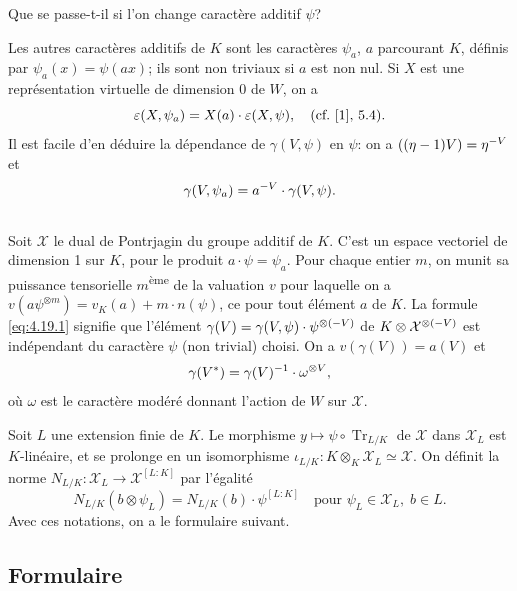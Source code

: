 \documentclass[12pt,a4paper]{article}
\theoremstyle{plain}
\theoremstyle{definition}
\theoremstyle{remark}
\DeclareMathOperator{\Tr}{Tr}
\newcommand{\cX}{\mathcal{X}}
\let\dim\relax\let\det\relax
\providecommand{\cX}{\mathcal{X}}
\providecommand{\Tr}{\operatorname{Tr}}
\begin{document}
Que se passe-t-il si l'on change caract\`ere additif $\psi$?

Les autres caract\`eres additifs de $K$ sont les caract\`eres $\psi_a$, $a$ parcourant $K$, d\'efinis par $\psi_a(x) = \psi(ax)$; ils sont non triviaux si $a$ est non nul. Si $X$ est une repr\'esentation virtuelle de dimension 0 de $W$, on a
\[
\varepsilon(X, \psi_a) = \det X(a) \cdot \varepsilon(X, \psi), \quad \text{(cf.~[1], 5.4)}.
\]
Il est facile d'en d\'eduire la d\'ependance de $\gamma(V, \psi)$ en $\psi$: on a $\det((\eta-1)V) = \eta^{-\dim V}$ et
\begin{equation}\label{eq:4.19.2}
\gamma(V, \psi_a) = a^{-\dim V} \cdot \gamma(V, \psi).
\end{equation}

\subsection{}
\label{sec:4.20}

Soit $\cX$ le dual de Pontrjagin du groupe additif de $K$. C'est un espace vectoriel de dimension 1 sur $K$, pour le produit $a \cdot \psi = \psi_a$. Pour chaque entier $m$, on munit sa puissance tensorielle $m$\textsuperscript{\`eme} de la valuation $v$ pour laquelle on a $v(a \psi^{\otimes m}) = v_K(a) + m \cdot n(\psi)$, ce pour tout \'el\'ement $a$ de $K$. La formule \eqref{eq:4.19.1} signifie que l'\'el\'ement $\gamma(V) = \gamma(V, \psi) \cdot \psi^{\otimes (-\dim V)}$ de $K \otimes \cX^{\otimes (-\dim V)}$ est ind\'ependant du caract\`ere $\psi$ (non trivial) choisi. On a $v(\gamma(V)) = a(V)$ et
\begin{equation}\label{eq:4.20}
\gamma(V^*) = \gamma(V)^{-1} \cdot \omega^{\otimes \dim V},
\end{equation}
o\`u $\omega$ est le caract\`ere mod\'er\'e donnant l'action de $W$ sur $\cX$.

Soit $L$ une extension finie de $K$. Le morphisme $y \mapsto \psi \circ \Tr_{L/K}$ de $\cX$ dans $\cX_L$ est $K$-lin\'eaire, et se prolonge en un isomorphisme $\iota_{L/K}: K \otimes_K \cX_L \simeq \cX$. On d\'efinit la norme $N_{L/K}: \cX_L \to \cX^{[L:K]}$ par l'\'egalit\'e
\[
N_{L/K}(b \otimes \psi_L) = N_{L/K}(b) \cdot \psi^{[L:K]} \quad \text{pour } \psi_L \in \cX_L, \; b \in L.
\]
Avec ces notations, on a le formulaire suivant.

\subsection{Formulaire}\label{sec:4.21}
\end{document}
